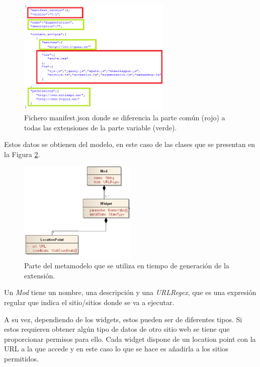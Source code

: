 \begin{figure}
\begin{center}
\includegraphics[width=0.65\textwidth]{figs/5-generatedManifestStaticDynamic.png}
\caption{Fichero manifest.json donde se diferencia la parte común (rojo) a todas las extensiones de la parte variable (verde).}
\label{fig:generatedManifestStaticDynamic}
\end{center}
\end{figure}

Estos datos se obtienen del modelo, en este caso de las clases que se presentan en la Figura \ref{fig:MetamodelReducedManifest}.

\begin{figure}
\centering
\includegraphics[width=0.5\textwidth]{./figs/5-MetamodelReducedManifest}
\caption{Parte del metamodelo que se utiliza en tiempo de generación de la extensión.}
\label{fig:MetamodelReducedManifest}
\end{figure}


Un \emph{Mod} tiene un nombre, una descripción y una \emph{URLRegex}, que es una expresión regular que indica el sitio/sitios donde se va a ejecutar.

A su vez, dependiendo de los widgets, estos pueden ser de diferentes tipos. Si estos requieren obtener algún tipo de datos de otro sitio web se tiene que proporcionar permisos para ello. Cada widget dispone de un location point con la URL a la que accede y en este caso lo que se hace es añadirla a los sitios permitidos.

